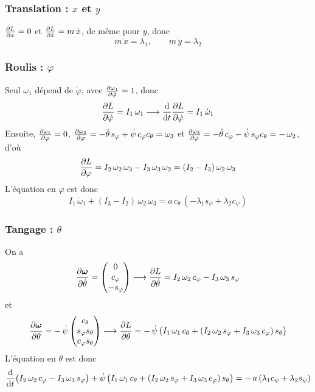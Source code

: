 \subsubsection{Translation : \texorpdfstring{$x$ et $y$}{x et y}}

$\frac{\partial L}{\partial x} = 0$ et $\frac{\partial L}{\partial \dot x} = m\,\dot x$, de même pour $y$,
donc
\[
    m\,\ddot x = \lambda_1,
    \qquad
    m\,\ddot y = \lambda_2
\]
\subsubsection{Roulis : \texorpdfstring{$\varphi$}{phi}}

Seul $\omega_1$ dépend de $\dot\varphi$, avec
$\frac{\partial \omega_1}{\partial \dot\varphi} = 1$, donc
\[
    \frac{\partial L}{\partial \dot\varphi} = I_1\,\omega_1
    \longrightarrow
    \frac{\mathrm{d}}{\mathrm{d} t}\frac{\partial L}{\partial \dot\varphi} = I_1\,\dot\omega_1
\]
Ensuite, $\frac{\partial \omega_1}{\partial \varphi} = 0$, $\frac{\partial \omega_2}{\partial \varphi}
= -\dot\theta\,s_\varphi + \dot\psi\,c_\varphi c_\theta = \omega_3$ et
$\frac{\partial \omega_3}{\partial \varphi} = -\dot\theta\,c_\varphi - \dot\psi\,s_\varphi
c_\theta = -\,\omega_2$, d'où
\[
    \frac{\partial L}{\partial \varphi} = I_2\,\omega_2\,\omega_3 - I_3\,\omega_3\,\omega_2
    = (I_2 - I_3)\,\omega_2\,\omega_3
\]
L'équation en $\varphi$ est donc
\[
    I_1\,\dot\omega_1 + (I_3 - I_2)\,\omega_2\,\omega_3
    = a\,c_\theta\,(-\lambda_1 s_\psi + \lambda_2 c_\psi)
\]
\subsubsection{Tangage : \texorpdfstring{$\theta$}{theta}}

On a
\[
    \frac{\partial \bm{\omega}}{\partial \dot\theta} = \begin{pmatrix}
        0\\ c_\varphi\\ -s_\varphi
    \end{pmatrix}
    \longrightarrow
    \frac{\partial L}{\partial \dot\theta} = I_2\,\omega_2\,c_\varphi
    - I_3\,\omega_3\,s_\varphi
\]
et
\[
    \frac{\partial \bm{\omega}}{\partial \theta} = -\,\dot\psi\begin{pmatrix}
        c_\theta\\ s_\varphi s_\theta\\ c_\varphi s_\theta
    \end{pmatrix}
    \longrightarrow
    \frac{\partial L}{\partial \theta} = -\,\dot\psi\,\bigl(I_1\,\omega_1\,c_\theta
    + (I_2\,\omega_2\,s_\varphi + I_3\,\omega_3\,c_\varphi)\,s_\theta
    \bigr)
\]
L'équation en $\theta$ est donc
\[
    \frac{\mathrm{d}}{\mathrm{d} t}\bigl(I_2\,\omega_2\,c_\varphi - I_3\,\omega_3\,s_\varphi\bigr)
    + \dot\psi\,\bigl(I_1\,\omega_1\,c_\theta
    + (I_2\,\omega_2\,s_\varphi + I_3\,\omega_3\,c_\varphi)\,s_\theta
    \bigr)
    = -\,a\,(\lambda_1 c_\psi + \lambda_2 s_\psi)
\]

